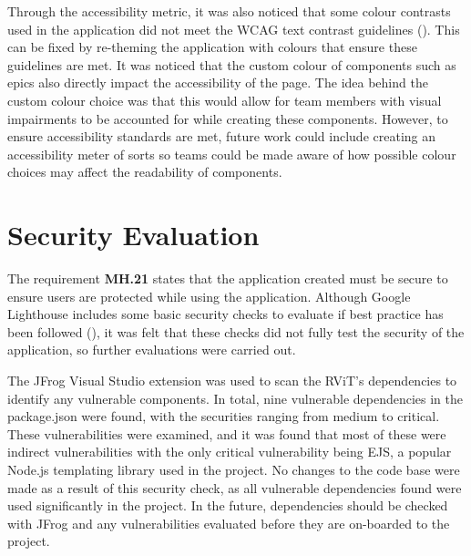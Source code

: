 \documentclass[l4proj.tex]{subfiles}
\begin{document}
Through the accessibility metric, it was also noticed that some colour contrasts used in the application did not meet the WCAG text contrast guidelines (\cite{WCAGContrastGuidelines}). This can be fixed by re-theming the application with colours that ensure these guidelines are met. It was noticed that the custom colour of components such as epics also directly impact the accessibility of the page. The idea behind the custom colour choice was that this would allow for team members with visual impairments to be accounted for while creating these components. However, to ensure accessibility standards are met, future work could include creating an accessibility meter of sorts so teams could be made aware of how possible colour choices may affect the readability of components.


\section{Security Evaluation}
The requirement \textbf{MH.21} states that the application created must be secure to ensure users are protected while using the application. Although Google Lighthouse includes some basic security checks to evaluate if best practice has been followed (\cite{LighthouseOverview}), it was felt that these checks did not fully test the security of the application, so further evaluations were carried out. 

The JFrog Visual Studio extension was used to scan the RViT's dependencies to identify any vulnerable components. In total, nine vulnerable dependencies in the package.json were found, with the securities ranging from medium to critical. These vulnerabilities were examined, and it was found that most of these were indirect vulnerabilities with the only critical vulnerability being EJS, a popular Node.js templating library used in the project. No changes to the code base were made as a result of this security check, as all vulnerable dependencies found were used significantly in the project. In the future, dependencies should be checked with JFrog and any vulnerabilities evaluated before they are on-boarded to the project. 
\end{document}
